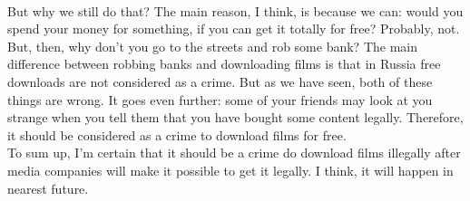 \documentclass[a4paper]{article}
\begin{document}
\\[5pt]
But why we still do that? The main reason, I think, is because we can: would you spend your money for something, if you can get it totally for free? Probably, not. But, then, why don't you go to the streets and rob some bank? The main difference between robbing banks and downloading films is that in Russia free downloads are not considered as a crime. But as we have seen, both of these things are wrong. It goes even further: some of your friends may look at you strange when you tell them that you have bought some content legally. Therefore, it should be considered as a crime to download films for free.
\\[5pt]
To sum up, I'm certain that it should be a crime do download films illegally after media companies will make it possible to get it legally. I think, it will happen in nearest future.
\end{document}

